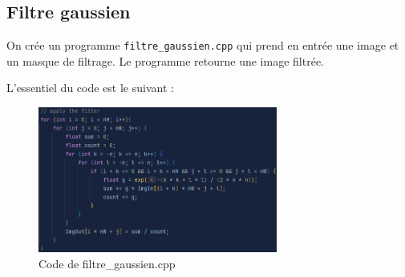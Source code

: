\documentclass[french,a4paper,10pt]{article}
\begin{document}
    \newpage
    \subsection{Filtre gaussien}\label{subsec:4.2}

    On crée un programme \texttt{filtre\_gaussien.cpp} qui prend en entrée une image et un masque de filtrage.
    Le programme retourne une image filtrée.

    L'essentiel du code est le suivant : %
    \begin{figure}[!htb]
        \centering
        \includegraphics[width=0.7\textwidth]{out/code-filtre-gaussien}
        \caption{Code de filtre\_gaussien.cpp}\label{fig:code-filtre-gaussien}
    \end{figure}
\end{document}
